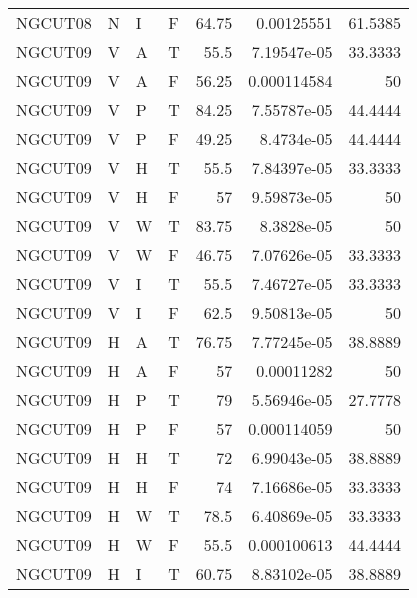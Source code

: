 \begin{longtable}{llllrrr}
    NGCUT08  & N         & I         & F          & 64.75      & 0.00125551  & 61.5385  \\
    NGCUT09  & V         & A         & T          & 55.5       & 7.19547e-05 & 33.3333  \\
    NGCUT09  & V         & A         & F          & 56.25      & 0.000114584 & 50       \\
    NGCUT09  & V         & P         & T          & 84.25      & 7.55787e-05 & 44.4444  \\
    NGCUT09  & V         & P         & F          & 49.25      & 8.4734e-05  & 44.4444  \\
    NGCUT09  & V         & H         & T          & 55.5       & 7.84397e-05 & 33.3333  \\
    NGCUT09  & V         & H         & F          & 57         & 9.59873e-05 & 50       \\
    NGCUT09  & V         & W         & T          & 83.75      & 8.3828e-05  & 50       \\
    NGCUT09  & V         & W         & F          & 46.75      & 7.07626e-05 & 33.3333  \\
    NGCUT09  & V         & I         & T          & 55.5       & 7.46727e-05 & 33.3333  \\
    NGCUT09  & V         & I         & F          & 62.5       & 9.50813e-05 & 50       \\
    NGCUT09  & H         & A         & T          & 76.75      & 7.77245e-05 & 38.8889  \\
    NGCUT09  & H         & A         & F          & 57         & 0.00011282  & 50       \\
    NGCUT09  & H         & P         & T          & 79         & 5.56946e-05 & 27.7778  \\
    NGCUT09  & H         & P         & F          & 57         & 0.000114059 & 50       \\
    NGCUT09  & H         & H         & T          & 72         & 6.99043e-05 & 38.8889  \\
    NGCUT09  & H         & H         & F          & 74         & 7.16686e-05 & 33.3333  \\
    NGCUT09  & H         & W         & T          & 78.5       & 6.40869e-05 & 33.3333  \\
    NGCUT09  & H         & W         & F          & 55.5       & 0.000100613 & 44.4444  \\
    NGCUT09  & H         & I         & T          & 60.75      & 8.83102e-05 & 38.8889  \\

\end{longtable}
